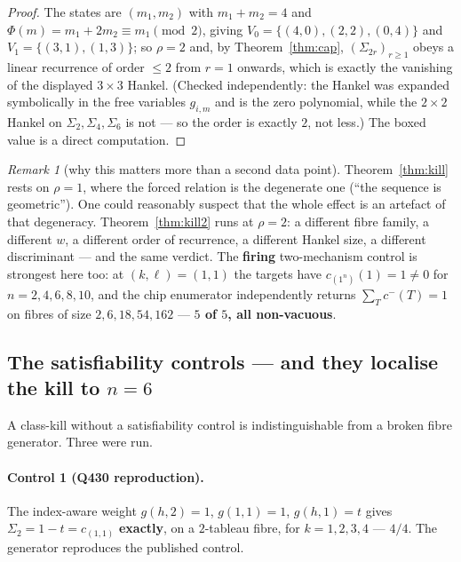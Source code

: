 \documentclass[11pt]{article}
\theoremstyle{plain}
\theoremstyle{definition}
\theoremstyle{remark}
\newtheorem{remark}[theorem]{Remark}
\newcommand{\cm}{c^{-}}
\begin{document}
\begin{proof}
The states are $(m_1,m_2)$ with $m_1+m_2=4$ and $\Phi(m)=m_1+2m_2\equiv m_1\pmod2$, giving
$V_0=\{(4,0),(2,2),(0,4)\}$ and $V_1=\{(3,1),(1,3)\}$; so $\rho=2$ and, by
Theorem~\ref{thm:cap}, $(\Sigma_{2r})_{r\ge1}$ obeys a linear recurrence of order $\le2$ from
$r=1$ onwards, which is exactly the vanishing of the displayed $3\times3$ Hankel. (Checked
independently: the Hankel was expanded symbolically in the free variables $g_{i,m}$ and is the
zero polynomial, while the $2\times2$ Hankel on $\Sigma_2,\Sigma_4,\Sigma_6$ is not --- so the
order is exactly $2$, not less.) The boxed value is a direct computation.
\end{proof}

\begin{remark}[why this matters more than a second data point]
Theorem~\ref{thm:kill} rests on $\rho=1$, where the forced relation is the degenerate one
(``the sequence is geometric''). One could reasonably suspect that the whole effect is an
artefact of that degeneracy. Theorem~\ref{thm:kill2} runs at $\rho=2$: a different fibre
family, a different $w$, a different order of recurrence, a different Hankel size, a different
discriminant --- and the same verdict. The \textbf{firing} two-mechanism control is strongest
here too: at $(k,\ell)=(1,1)$ the targets have $c_{(1^n)}(1)=1\neq0$ for $n=2,4,6,8,10$, and the
chip enumerator independently returns $\sum_T\cm(T)=1$ on fibres of size
$2,6,18,54,162$ --- \textbf{$5$ of $5$, all non-vacuous}.
\end{remark}

\subsection{The satisfiability controls --- and they localise the kill to $n=6$}

A class-kill without a satisfiability control is indistinguishable from a broken fibre
generator. Three were run.

\paragraph{Control 1 (Q430 reproduction).} The index-aware weight $g(h,2)=1$, $g(1,1)=1$,
$g(h,1)=t$ gives $\Sigma_2=1-t=c_{(1,1)}$ \textbf{exactly}, on a $2$-tableau fibre, for
$k=1,2,3,4$ --- $4/4$. The generator reproduces the published control.
\end{document}

